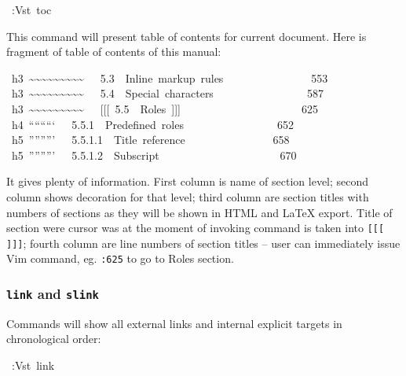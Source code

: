 \documentclass[12pt]{article}
\begin{document}
\begin{ttfamily}\begin{flushleft}
\mbox{~:Vst~toc}\\
\end{flushleft}\end{ttfamily}

This command will present table of contents for current document. Here
is fragment of table of contents of this manual:

\begin{ttfamily}\begin{flushleft}
\mbox{~h3~\~{}\~{}\~{}\~{}\~{}\~{}\~{}\~{}\~{}~~~5.3~~Inline~markup~rules~~~~~~~~~~~~~~~~553}\\
\mbox{~h3~\~{}\~{}\~{}\~{}\~{}\~{}\~{}\~{}\~{}~~~5.4~~Special~characters~~~~~~~~~~~~~~~~~587}\\
\mbox{~h3~\~{}\~{}\~{}\~{}\~{}\~{}\~{}\~{}\~{}~~~[[[~5.5~~Roles~]]]~~~~~~~~~~~~~~~~~~~~~~625}\\
\mbox{~h4~`````````~~~5.5.1~~Predefined~roles~~~~~~~~~~~~~~~~~652}\\
\mbox{~h5~'''''''''~~~5.5.1.1~~Title~reference~~~~~~~~~~~~~~~~658}\\
\mbox{~h5~'''''''''~~~5.5.1.2~~Subscript~~~~~~~~~~~~~~~~~~~~~~670}\\
\end{flushleft}\end{ttfamily}

It gives plenty of information. First column is name of section level; second
column shows decoration for that level; third column are section titles with
numbers of sections as they will be shown in HTML and \LaTeX{} export. Title of
section were cursor was at the moment of invoking command is taken into 
\texttt{[[[ ]]]}; fourth column are line numbers of section titles -- user can
immediately issue Vim command, eg. \texttt{:625} to go to Roles section.

\hypertarget{l9696link9696-and-9696slink9696}{}
\subsubsection{\texttt{link} and \texttt{slink}}

Commands will show all external links and internal explicit targets in
chronological order:

\begin{ttfamily}\begin{flushleft}
\mbox{~:Vst~link}\\
\end{flushleft}\end{ttfamily}
\end{document}

